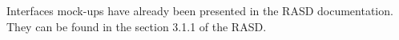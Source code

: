 Interfaces mock-ups have already been presented in the RASD documentation.
They can be found in the section 3.1.1 of the RASD.
